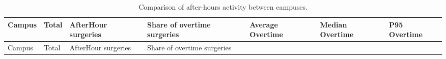 \documentclass[
]{article}
\begin{document}
\begin{longtable}[]{@{}
  >{\centering\arraybackslash}p{}
  >{\centering\arraybackslash}p{}
  >{\centering\arraybackslash}p{}
  >{\centering\arraybackslash}p{}
  >{\centering\arraybackslash}p{}
  >{\centering\arraybackslash}p{}
  >{\centering\arraybackslash}p{}@{}}
\caption{Comparison of after-hours activity between campuses.
\label{tab:afterhours_campus}}\tabularnewline
\toprule\noalign{}
\begin{minipage}[b]{\linewidth}\centering
Campus
\end{minipage} & \begin{minipage}[b]{\linewidth}\centering
Total
\end{minipage} & \begin{minipage}[b]{\linewidth}\centering
AfterHour surgeries
\end{minipage} & \begin{minipage}[b]{\linewidth}\centering
Share of overtime surgeries
\end{minipage} & \begin{minipage}[b]{\linewidth}\centering
Average Overtime
\end{minipage} & \begin{minipage}[b]{\linewidth}\centering
Median Overtime
\end{minipage} & \begin{minipage}[b]{\linewidth}\centering
P95 Overtime
\end{minipage} \\
\midrule\noalign{}
\endfirsthead
\toprule\noalign{}
\begin{minipage}[b]{\linewidth}\centering
Campus
\end{minipage} & \begin{minipage}[b]{\linewidth}\centering
Total
\end{minipage} & \begin{minipage}[b]{\linewidth}\centering
AfterHour surgeries
\end{minipage} & \begin{minipage}[b]{\linewidth}\centering
Share of overtime surgeries
\end{minipage} & \begin{minipage}[b]{\linewidth}\centering

\end{minipage}
\end{longtable}
\end{document}
